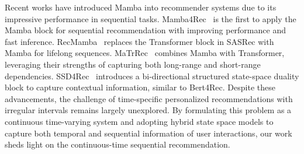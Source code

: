 Recent works have introduced Mamba into recommender systems due to its impressive performance in sequential tasks. Mamba4Rec~\cite{liu2024mamba4rec} is the first to apply the Mamba block for sequential recommendation with improving performance and fast inference. RecMamba~\cite{yang2024uncovering} replaces the Transformer block in SASRec with Mamba for lifelong sequences. MaTrRec~\cite{zhang2024matrrec} combines Mamba with Transformer, leveraging their strengths of capturing both long-range and short-range dependencies. SSD4Rec~\cite{qu2025ssd4rec} introduces a bi-directional structured state-space duality block to capture contextual information, similar to Bert4Rec.
Despite these advancements, the challenge of time-specific personalized recommendations with irregular intervals remains largely unexplored. By formulating this problem as a continuous time-varying system and adopting hybrid state space models to capture both temporal and sequential information of user interactions, our work sheds light on the continuous-time sequential recommendation.